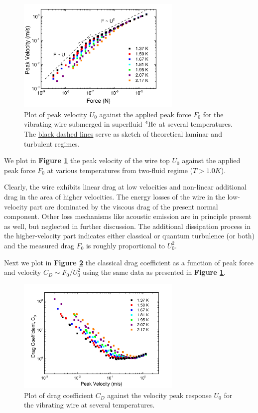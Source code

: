 \begin{figure}[h]
	\centering
	\includegraphics[width=0.7\textwidth]{graphics/results/wire_force_vel}
	\caption{Plot of peak velocity $U_0$ against the applied peak force $F_0$ for the vibrating wire submerged in superfluid ${}^4\mathrm{He}$ at several temperatures. The \underline{black dashed lines} serve as sketch of theoretical laminar and turbulent regimes.}
	\label{wire_vel_force}
\end{figure}

We plot in \textbf{Figure \ref{wire_vel_force}} the peak velocity of the wire top $U_0$ against the applied peak force $F_0$ at various temperatures from two-fluid regime ($T > 1.0\unit{K}$).

Clearly, the wire exhibits linear drag at low velocities and non-linear additional drag in the area of higher velocities. The energy losses of the wire in the low-velocity part are dominated by the viscous drag of the present normal component. Other loss mechanisms like acoustic emission are in principle present as well, but neglected in further discussion. The additional dissipation process in the higher-velocity part indicates either classical or quantum turbulence (or both) and the measured drag $F_0$ is roughly proportional to $U_0^2$.

Next we plot in \textbf{Figure \ref{wire_drag_vel}} the classical drag coefficient as a function of peak force and velocity $C_D \sim F_0 / U_0^2$ using the same data as presented in \textbf{Figure \ref{wire_vel_force}}.

\begin{figure}[h]
	\centering
	\includegraphics[width=0.7\textwidth]{graphics/results/wire_drag_vel}
	\caption{Plot of drag coefficient $C_D$ against the velocity peak response $U_0$ for the vibrating wire at several temperatures.}
	\label{wire_drag_vel}
\end{figure}

